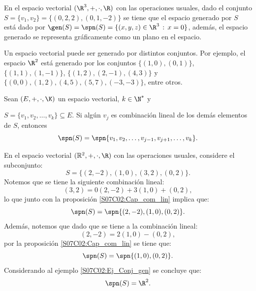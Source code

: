 \documentclass[compacto,10pt]{pubciencias-notas}
\begin{document}
\begin{ejem}
En el espacio vectorial $(\R^{3},+,\cdot,\R)$ con las operaciones usuales, dado el conjunto $S = \{v_{1}, v_{2}\} = \{(0, 2, 2), (0, 1, - 2)\}$ se tiene que el espacio generado por $S$ está dado por $\gen(S) = \spn(S) = \{(x,y,z)\in\R^{3}\,:\,x=0\}$, además, el espacio generado se representa gráficamente como un plano en el espacio.


\end{ejem}

\begin{obs}
Un espacio vectorial puede ser generado por distintos conjuntos. Por ejemplo, el espacio $\R^{2}$ está generado por los conjuntos $\{(1, 0), (0, 1)\}$, $\{(1, 1), (1, - 1)\}$, $\{(1, 2), (2, -1), (4, 3)\}$ y $\{(0, 0), (1, 2), (4, 5), (5, 7), (- 3, - 3)\}$, entre otros.
\end{obs}

\begin{prop}\label{S07C02:Cap_com_lin}
Sean $(E,+,\cdot,\K)$ un espacio vectorial, $k\in\N^{*}$ y

\noindent$S=\{v_1,v_2,\ldots,v_k\}\subseteq E$. Si algún $v_{j}$ es combinación lineal de los demás elementos de $S$, entonces
\[
    \spn(S) = \spn\{v_{1}, v_{2}, \ldots, v_{j - 1}, v_{j + 1}, \ldots, v_{k}\}.
\]
\end{prop}

\begin{ejem}\hspace{0pt} En el espacio vectorial $(\mathbb{R}^2,+,\cdot,\R)$ con las operaciones usuales, considere el subconjunto:
\[
    S=\{(2,-2), (1,0), (3,2), (0,2)\}.
\]
Notemos que se tiene la siguiente combinación lineal:
\[
    (3,2)=0(2,-2)+3(1,0)+(0,2),
\]
lo que junto con la proposición \ref{S07C02:Cap_com_lin} implica que:
\[
    \spn(S) = \spn\{(2,-2), (1,0), (0,2)\}.
\]
Además, notemos que dado que se tiene a la combinación lineal:
\[
    (2,-2)=2(1,0)-(0,2),
\]
por la proposición \ref{S07C02:Cap_com_lin} se tiene que:
\[
    \spn(S) = \spn\{(1,0), (0,2)\}.
\]
Considerando al ejemplo \ref{S07C02:Ej_Conj_gen} se concluye que:
\[
     \spn(S) = \R^{2}.
\]
\end{ejem}
\end{document}
